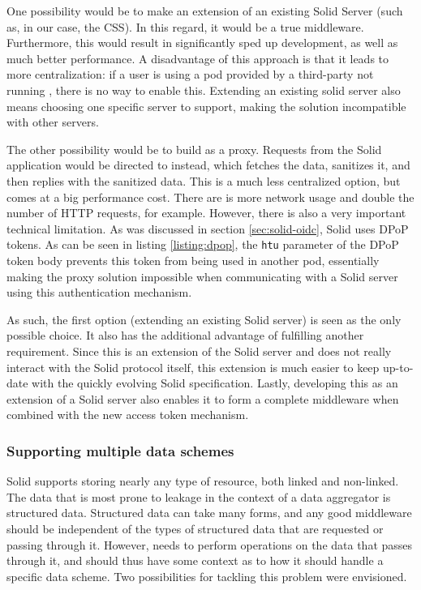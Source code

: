 One possibility would be to make \middleware{} an extension of an existing Solid Server (such as, in our case, the \gls{CSS}). In this regard, it would be a true middleware. Furthermore, this would result in significantly sped up development, as well as much better performance. A disadvantage of this approach is that it leads to more centralization: if a user is using a pod provided by a third-party not running \middleware{}, there is no way to enable this. Extending an existing solid server also means choosing one specific server to support, making the solution incompatible with other servers.

The other possibility would be to build \middleware{} as a proxy. Requests from the Solid application would be directed to \middleware{} instead, which fetches the data, sanitizes it, and then replies with the sanitized data. This is a much less centralized option, but comes at a big performance cost. There are is more network usage and double the number of HTTP requests, for example. However, there is also a very important technical limitation. As was discussed in section \ref{sec:solid-oidc}, Solid uses \gls{DPoP} tokens. As can be seen in listing \ref{listing:dpop}, the \texttt{htu} parameter of the \gls{DPoP} token body prevents this token from being used in another pod, essentially making the proxy solution impossible when communicating with a Solid server using this authentication mechanism.

As such, the first option (extending an existing Solid server) is seen as the only possible choice. It also has the additional advantage of fulfilling another requirement. Since this is an extension of the Solid server and does not really interact with the Solid protocol itself, this extension is much easier to keep up-to-date with the quickly evolving Solid specification. Lastly, developing this as an extension of a Solid server also enables it to form a complete middleware when combined with the new access token mechanism.

\subsubsection{Supporting multiple data schemes}
Solid supports storing nearly any type of resource, both linked and non-linked. The data that is most prone to leakage in the context of a data aggregator is structured data. Structured data can take many forms, and any good middleware should be independent of the types of structured data that are requested or passing through it. However, \middleware{} needs to perform operations on the data that passes through it, and should thus have some context as to how it should handle a specific data scheme. Two possibilities for tackling this problem were envisioned.

